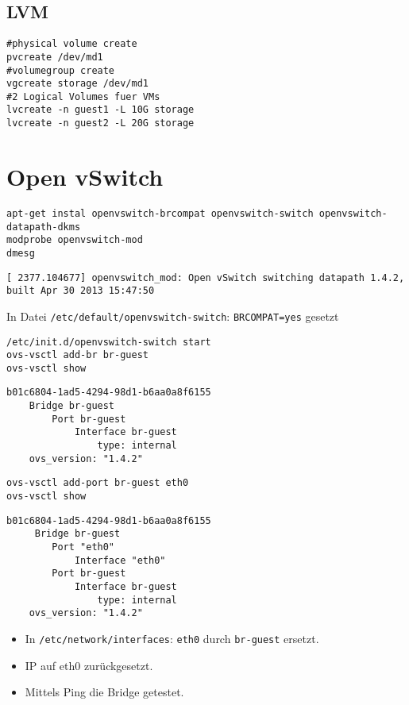 \section{LVM}
\begin{verbatim}
#physical volume create
pvcreate /dev/md1 
#volumegroup create 
vgcreate storage /dev/md1
#2 Logical Volumes fuer VMs
lvcreate -n guest1 -L 10G storage
lvcreate -n guest2 -L 20G storage
\end{verbatim} 

\chapter{Open vSwitch}
\begin{verbatim}
apt-get instal openvswitch-brcompat openvswitch-switch openvswitch-datapath-dkms
modprobe openvswitch-mod
dmesg
\end{verbatim} 
\setupVerbatimOut
\begin{verbatim}
[ 2377.104677] openvswitch_mod: Open vSwitch switching datapath 1.4.2, built Apr 30 2013 15:47:50
\end{verbatim}
In Datei \verb#/etc/default/openvswitch-switch#: \verb#BRCOMPAT=yes# gesetzt
\setupVerbatimBash
\begin{verbatim}
/etc/init.d/openvswitch-switch start
ovs-vsctl add-br br-guest
ovs-vsctl show
\end{verbatim}
\setupVerbatimOut
\begin{verbatim}
b01c6804-1ad5-4294-98d1-b6aa0a8f6155
    Bridge br-guest
        Port br-guest
            Interface br-guest
                type: internal
    ovs_version: "1.4.2"
\end{verbatim} 
\setupVerbatimBash
\begin{verbatim}
ovs-vsctl add-port br-guest eth0
ovs-vsctl show
\end{verbatim}
\setupVerbatimOut
\begin{verbatim}
b01c6804-1ad5-4294-98d1-b6aa0a8f6155
     Bridge br-guest
        Port "eth0"
            Interface "eth0"
        Port br-guest
            Interface br-guest
                type: internal
    ovs_version: "1.4.2"
\end{verbatim}
\begin{itemize}
\item In \verb#/etc/network/interfaces#: \verb#eth0# durch \verb#br-guest# ersetzt. 
\item IP auf eth0 zurückgesetzt. 
\item Mittels Ping die Bridge getestet.
\end{itemize}
